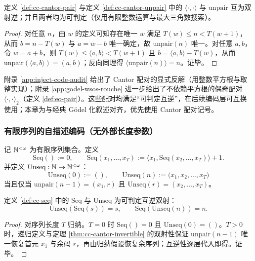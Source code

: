 \begin{theorem}[可判定互逆]\label{thm:cc-cantor-invertible}
定义 \ref{def:cc-cantor-pair} 与定义 \ref{def:cc-cantor-unpair} 中的 $\langle\cdot,\cdot\rangle$ 与 $\mathrm{unpair}$ 互为双射逆；并且两者均为可判定（仅用有限整数运算与最大三角数搜索）。
\end{theorem}

\begin{proof}
对任意 $n$，由 $w$ 的定义可知存在唯一 $w$ 满足 $T(w)\le n<T(w+1)$，从而 $b=n-T(w)$ 与 $a=w-b$ 唯一确定，故 $\mathrm{unpair}(n)$ 唯一。对任意 $a,b$，令 $w=a+b$，则 $T(w)\le \langle a,b\rangle <T(w+1)$ 且 $b=\langle a,b\rangle-T(w)$，从而 $\mathrm{unpair}(\langle a,b\rangle)=(a,b)$；反向同理得 $\langle\mathrm{unpair}(n)\rangle=n$。证毕。
\end{proof}

\begin{remark}[与本文附录中的替代配对]
附录 \ref{app:inject-code-audit} 给出了 Cantor 配对的显式反解（用整数平方根与取整实现）；附录 \ref{app:godel-wsos-rouche} 进一步给出了不依赖平方根的偶奇配对 $\langle\cdot,\cdot\rangle_2$（定义 \ref{def:eo-pair}）。这些配对均满足“可判定互逆”，在后续编码层可互换使用；本章为与经典 Gödel 化叙述对齐，优先使用 Cantor 配对记号。
\end{remark}

\subsubsection{有限序列的自描述编码（无外部长度参数）}
\begin{definition}[自描述序列编码]\label{def:cc-seq}
记 $\mathbb{N}^{<\omega}$ 为有限序列集合。定义
$$
\mathrm{Seq}():=0,\qquad
\mathrm{Seq}(x_1,\dots,x_T):=\big\langle x_1,\mathrm{Seq}(x_2,\dots,x_T)\big\rangle+1.
$$
并定义 $\mathrm{Unseq}:\mathbb{N}\to\mathbb{N}^{<\omega}$：
$$
\mathrm{Unseq}(0):=(),\qquad
\mathrm{Unseq}(n):=\bigl(x_1,x_2,\dots,x_T\bigr)
$$
当且仅当 $\mathrm{unpair}(n-1)=(x_1,r)$ 且 $\mathrm{Unseq}(r)=(x_2,\dots,x_T)$。
\end{definition}

\begin{theorem}\label{thm:cc-seq-bijection}
定义 \ref{def:cc-seq} 中的 $\mathrm{Seq}$ 与 $\mathrm{Unseq}$ 为可判定互逆双射：
$$
\mathrm{Unseq}(\mathrm{Seq}(s))=s,\qquad \mathrm{Seq}(\mathrm{Unseq}(n))=n.
$$
\end{theorem}

\begin{proof}
对序列长度 $T$ 归纳。$T=0$ 时 $\mathrm{Seq}()=0$ 且 $\mathrm{Unseq}(0)=()$。$T>0$ 时，递归定义与定理 \ref{thm:cc-cantor-invertible} 的双射性保证 $\mathrm{unpair}(n-1)$ 唯一恢复首元 $x_1$ 与余码 $r$，再由归纳假设恢复余序列；互逆性逐层代入即得。证毕。
\end{proof}

